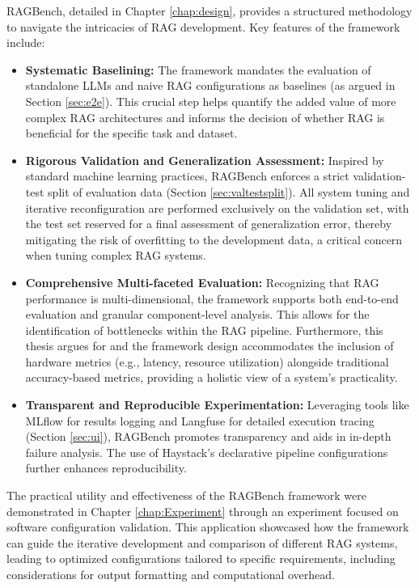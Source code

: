RAGBench, detailed in Chapter \ref{chap:design}, provides a structured methodology to navigate the intricacies of RAG development. Key features of the framework include:
\begin{itemize}
    \item \textbf{Systematic Baselining:} The framework mandates the evaluation of standalone LLMs and naive RAG configurations as baselines (as argued in Section \ref{sec:e2e}). This crucial step helps quantify the added value of more complex RAG architectures and informs the decision of whether RAG is beneficial for the specific task and dataset.
    \item \textbf{Rigorous Validation and Generalization Assessment:} Inspired by standard machine learning practices, RAGBench enforces a strict validation-test split of evaluation data (Section \ref{sec:valtestsplit}). All system tuning and iterative reconfiguration are performed exclusively on the validation set, with the test set reserved for a final assessment of generalization error, thereby mitigating the risk of overfitting to the development data, a critical concern when tuning complex RAG systems.
    \item \textbf{Comprehensive Multi-faceted Evaluation:} Recognizing that RAG performance is multi-dimensional, the framework supports both end-to-end evaluation and granular component-level analysis. This allows for the identification of bottlenecks within the RAG pipeline. Furthermore, this thesis argues for and the framework design accommodates the inclusion of hardware metrics (e.g., latency, resource utilization) alongside traditional accuracy-based metrics, providing a holistic view of a system's practicality.
    \item \textbf{Transparent and Reproducible Experimentation:} Leveraging tools like MLflow for results logging and Langfuse for detailed execution tracing (Section \ref{sec:ui}), RAGBench promotes transparency and aids in in-depth failure analysis. The use of Haystack's declarative pipeline configurations further enhances reproducibility.
\end{itemize}

The practical utility and effectiveness of the RAGBench framework were demonstrated in Chapter \ref{chap:Experiment} through an experiment focused on software configuration validation. This application showcased how the framework can guide the iterative development and comparison of different RAG systems, leading to optimized configurations tailored to specific requirements, including considerations for output formatting and computational overhead.

